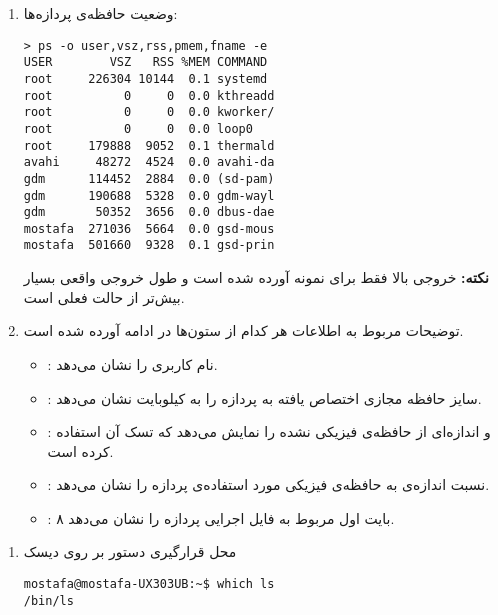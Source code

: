 \begin{enumerate}
	\item وضعیت حافظه‌ی پردازه‌ها:
	
	\begin{Verbatim}[tabsize=4]
> ps -o user,vsz,rss,pmem,fname -e                                       
USER        VSZ   RSS %MEM COMMAND
root     226304 10144  0.1 systemd
root          0     0  0.0 kthreadd
root          0     0  0.0 kworker/
root          0     0  0.0 loop0
root     179888  9052  0.1 thermald
avahi     48272  4524  0.0 avahi-da
gdm      114452  2884  0.0 (sd-pam)
gdm      190688  5328  0.0 gdm-wayl
gdm       50352  3656  0.0 dbus-dae
mostafa  271036  5664  0.0 gsd-mous
mostafa  501660  9328  0.1 gsd-prin
	\end{Verbatim}
	\textbf{نکته:} خروجی بالا فقط برای نمونه آورده شده است و طول خروجی واقعی بسیار بیش‌تر از حالت فعلی است.
	\item توضیحات مربوط به  اطلاعات هر کدام از ستون‌ها در ادامه آورده شده است.
	
	\begin{itemize}
		\item \textbf{}:
	نام کاربری را نشان می‌دهد.
		\item \textbf{}:
		سایز حافظه مجازی اختصاص یافته به پردازه را به کیلوبایت نشان می‌دهد.
		\item \textbf{}:
		 و اندازه‌ای از حافظه‌ی فیزیکی  نشده را نمایش می‌دهد که تسک آن استفاده کرده است.
		\item \textbf{}:
		نسبت اندازه‌ی  به حافظه‌ی فیزیکی مورد استفاده‌ی پردازه را نشان می‌دهد.
		\item \textbf{}:
	۸ بایت اول  مربوط به فایل اجرایی پردازه را نشان می‌دهد. 
	\end{itemize}
\end{enumerate}

\newpage

\begin{enumerate}
	\item محل قرارگیری دستور  بر روی دیسک
	\begin{Verbatim}
mostafa@mostafa-UX303UB:~$ which ls
/bin/ls

	\end{Verbatim}
\end{enumerate}
